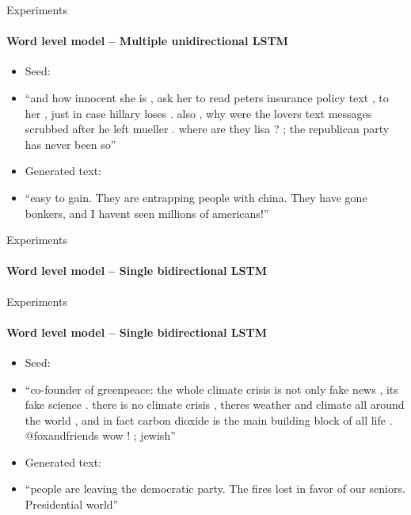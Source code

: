 \documentclass{beamer}
\begin{document}
\begin{frame}{Experiments}
\framesubtitle{Word level model -- Multiple unidirectional LSTM}
\begin{itemize}
\item Seed:
\item[] ``and how innocent she is , ask her to read peters insurance policy text , to her , just in case hillary loses . also , why were the lovers text messages scrubbed after he left mueller . where are they lisa ? ; the republican party has never been so''
\vspace{5mm}
\item Generated text:
\item[] ``easy to gain. They are entrapping people with china. They have gone bonkers, and I havent seen millions of americans!''
\end{itemize}
\end{frame}

\begin{frame}{Experiments}
\framesubtitle{Word level model -- Single bidirectional LSTM}
\end{frame}

\begin{frame}{Experiments}
\framesubtitle{Word level model -- Single bidirectional LSTM}
\begin{itemize}
\item Seed:
\item[] ``co-founder of greenpeace: the whole climate crisis is not only fake news , its fake science . there is no climate crisis , theres weather and climate all around the world , and in fact carbon dioxide is the main building block of all life . @foxandfriends wow ! ; jewish''
\vspace{5mm}
\item Generated text:
\item[] ``people are leaving the democratic party. The fires lost in favor of our seniors. Presidential world''
\end{itemize}
\end{frame}
\end{document}
